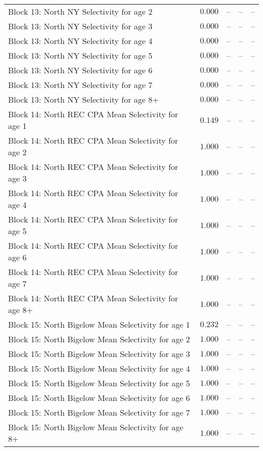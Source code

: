 \documentclass[
]{article}
\begin{document}
\begin{landscape}
\begin{longtable}[t]{lrrrr}
Block 13: North NY Selectivity for age 2 & $0.000$ & -- & -- & --\\
\addlinespace
Block 13: North NY Selectivity for age 3 & $0.000$ & -- & -- & --\\
Block 13: North NY Selectivity for age 4 & $0.000$ & -- & -- & --\\
Block 13: North NY Selectivity for age 5 & $0.000$ & -- & -- & --\\
Block 13: North NY Selectivity for age 6 & $0.000$ & -- & -- & --\\
Block 13: North NY Selectivity for age 7 & $0.000$ & -- & -- & --\\
\addlinespace
Block 13: North NY Selectivity for age 8+ & $0.000$ & -- & -- & --\\
Block 14: North REC CPA Mean Selectivity for age 1 & $0.149$ & -- & -- & --\\
Block 14: North REC CPA Mean Selectivity for age 2 & $1.000$ & -- & -- & --\\
Block 14: North REC CPA Mean Selectivity for age 3 & $1.000$ & -- & -- & --\\
Block 14: North REC CPA Mean Selectivity for age 4 & $1.000$ & -- & -- & --\\
\addlinespace
Block 14: North REC CPA Mean Selectivity for age 5 & $1.000$ & -- & -- & --\\
Block 14: North REC CPA Mean Selectivity for age 6 & $1.000$ & -- & -- & --\\
Block 14: North REC CPA Mean Selectivity for age 7 & $1.000$ & -- & -- & --\\
Block 14: North REC CPA Mean Selectivity for age 8+ & $1.000$ & -- & -- & --\\
Block 15: North Bigelow Mean Selectivity for age 1 & $0.232$ & -- & -- & --\\
\addlinespace
Block 15: North Bigelow Mean Selectivity for age 2 & $1.000$ & -- & -- & --\\
Block 15: North Bigelow Mean Selectivity for age 3 & $1.000$ & -- & -- & --\\
Block 15: North Bigelow Mean Selectivity for age 4 & $1.000$ & -- & -- & --\\
Block 15: North Bigelow Mean Selectivity for age 5 & $1.000$ & -- & -- & --\\
Block 15: North Bigelow Mean Selectivity for age 6 & $1.000$ & -- & -- & --\\
\addlinespace
Block 15: North Bigelow Mean Selectivity for age 7 & $1.000$ & -- & -- & --\\
Block 15: North Bigelow Mean Selectivity for age 8+ & $1.000$ & -- & -- & --\\

\end{longtable}
\end{landscape}
\end{document}
